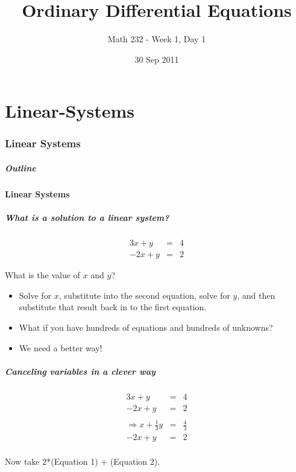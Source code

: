 \part{Linear-Systems}
\section{Linear Systems}

\title{Ordinary Differential Equations}
\subtitle{Math 232 - Week 1, Day 1}
\date{30 Sep 2011}

\begin{frame}
  \titlepage
\end{frame}

\begin{frame}
  \frametitle{Outline}
\end{frame}


\subsection{Linear Systems}


\begin{frame}
  \frametitle{What is a solution to a linear system?}

  \begin{eqnarray*}
    3x + y & = & 4 \\
    -2x + y & = & 2
  \end{eqnarray*}

  What is the value of $x$ and $y$?

  \begin{itemize}
  \item<3-> Solve for $x$, substitute into the second equation, solve
    for $y$, and then substitute that result back in to the first
    equation.
  \item<4-> What if you have hundreds of equations and hundreds of
    unknowns?
  \item<5-> We need a better way!
  \end{itemize}

\end{frame}


\begin{frame}
  \frametitle{Canceling variables in a clever way}

  \begin{eqnarray*}
    3x + y & = & 4 \\
    -2x + y & = & 2 \\
    \\
    \Rightarrow
    x + \frac{1}{3}y & = & \frac{4}{3} \\
    -2x + y & = & 2 \\    
  \end{eqnarray*}
  
  Now take 2*(Equation 1) + (Equation 2).

\end{frame}


